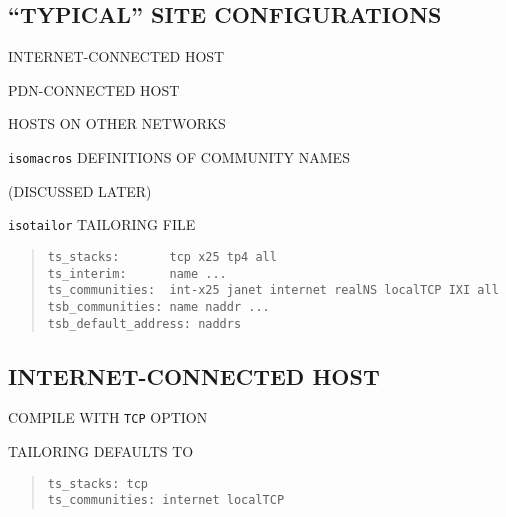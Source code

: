 \begin{bwslide}
\part	{``TYPICAL'' SITE CONFIGURATIONS}\bf

\begin{nrtc}
\item	INTERNET-CONNECTED HOST

\item	PDN-CONNECTED HOST

\item	HOSTS ON OTHER NETWORKS
\end{nrtc}
\end{bwslide}


\begin{bwslide}

\begin{nrtc}
\item	\verb"isomacros" DEFINITIONS OF COMMUNITY NAMES
    \begin{nrtc}
    \item	(DISCUSSED LATER)
    \end{nrtc}

\item	\verb"isotailor" TAILORING FILE
\begin{quote}\small\begin{verbatim}
ts_stacks:       tcp x25 tp4 all
ts_interim:      name ...
ts_communities:  int-x25 janet internet realNS localTCP IXI all
tsb_communities: name naddr ...
tsb_default_address: naddrs
\end{verbatim}\end{quote}
\end{nrtc}
\end{bwslide}


\begin{bwslide}
\part*	{INTERNET-CONNECTED HOST}\bf

\begin{nrtc}
\item	COMPILE WITH \verb"TCP" OPTION

\item	TAILORING DEFAULTS TO
\begin{quote}\small\begin{verbatim}
ts_stacks: tcp
ts_communities: internet localTCP
\end{verbatim}\end{quote}
\end{nrtc}
\end{bwslide}


